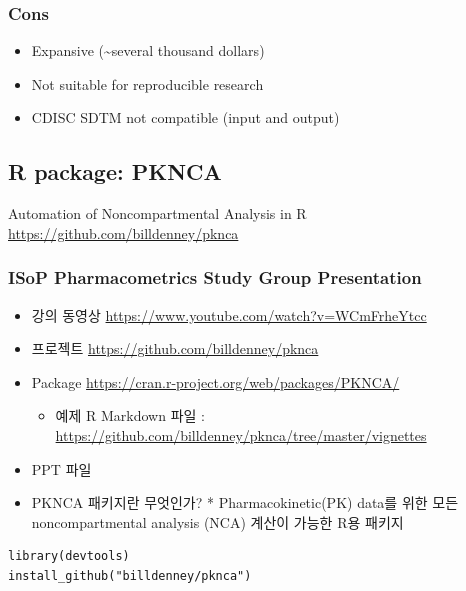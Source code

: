 \documentclass[]{krantz}
\providecommand{\tightlist}{%
  \setlength{\itemsep}{0pt}\setlength{\parskip}{0pt}}
\theoremstyle{definition}
\theoremstyle{definition}
\theoremstyle{definition}
\theoremstyle{remark}
\begin{document}
\subsubsection{Cons}\label{cons}

\begin{itemize}
\tightlist
\item
  Expansive (\textasciitilde{}several thousand dollars)
\item
  Not suitable for reproducible research
\item
  CDISC SDTM not compatible (input and output)
\end{itemize}

\subsection{R package: PKNCA}\label{r-package-pknca}

Automation of Noncompartmental Analysis in R
\url{https://github.com/billdenney/pknca}

\subsubsection{ISoP Pharmacometrics Study Group
Presentation}\label{isop-pharmacometrics-study-group-presentation}

\begin{itemize}
\tightlist
\item
  강의 동영상 \url{https://www.youtube.com/watch?v=WCmFrheYtcc}
\item
  프로젝트 \url{https://github.com/billdenney/pknca}
\item
  Package \url{https://cran.r-project.org/web/packages/PKNCA/}

  \begin{itemize}
  \tightlist
  \item
    예제 R Markdown 파일 :
    \url{https://github.com/billdenney/pknca/tree/master/vignettes}
  \end{itemize}
\item
  PPT 파일
\item
  PKNCA 패키지란 무엇인가? * Pharmacokinetic(PK) data를 위한 모든
  noncompartmental analysis (NCA) 계산이 가능한 R용 패키지
\end{itemize}

\begin{verbatim}
library(devtools)
install_github("billdenney/pknca")
\end{verbatim}
\end{document}
